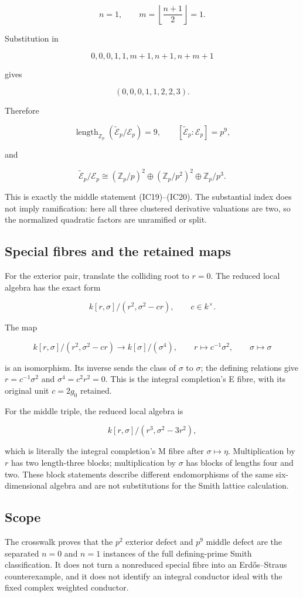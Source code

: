 \[
n=1,\qquad m=\left\lfloor\frac{n+1}{2}\right\rfloor=1.
\]

Substitution in

\[
0,0,0,1,1,m+1,n+1,n+m+1
\]

gives

\[
\boxed{(0,0,0,1,1,2,2,3).}
\]

Therefore

\[
\operatorname{length}_{\mathbb Z_p}
(\widetilde{\mathscr E}_p/\mathscr E_p)=9,\qquad
[\widetilde{\mathscr E}_p:\mathscr E_p]=p^9,
\]

and

\[
\widetilde{\mathscr E}_p/\mathscr E_p
\cong
(\mathbb Z_p/p)^2\oplus
(\mathbb Z_p/p^2)^2\oplus
\mathbb Z_p/p^3.
\]

This is exactly the middle statement (IC19)--(IC20). The substantial
index does not imply ramification: here all three clustered derivative
valuations are two, so the normalized quadratic factors are unramified
or split.

\subsection{Special fibres and the retained
maps}\label{special-fibres-and-the-retained-maps}

For the exterior pair, translate the colliding root to \(r=0\). The
reduced local algebra has the exact form

\[
k[r,\sigma]/(r^2,\sigma^2-c r),\qquad c\in k^\times.
\]

The map

\[
k[r,\sigma]/(r^2,\sigma^2-c r)
\longrightarrow k[\sigma]/(\sigma^4),\qquad
r\longmapsto c^{-1}\sigma^2,\qquad
\sigma\longmapsto\sigma
\]

is an isomorphism. Its inverse sends the class of \(\sigma\) to
\(\sigma\); the defining relations give \(r=c^{-1}\sigma^2\) and
\(\sigma^4=c^2r^2=0\). This is the integral completion's E fibre, with
its original unit \(c=2g_0\) retained.

For the middle triple, the reduced local algebra is

\[
k[r,\sigma]/(r^3,\sigma^2-3r^2),
\]

which is literally the integral completion's M fibre after
\(\sigma\mapsto\eta\). Multiplication by \(r\) has two length-three
blocks; multiplication by \(\sigma\) has blocks of lengths four and two.
These block statements describe different endomorphisms of the same
six-dimensional algebra and are not substitutions for the Smith lattice
calculation.

\subsection{Scope}\label{scope}

The crosswalk proves that the \(p^2\) exterior defect and \(p^9\) middle
defect are the separated \(n=0\) and \(n=1\) instances of the full
defining-prime Smith classification. It does not turn a nonreduced
special fibre into an Erdős--Straus counterexample, and it does not
identify an integral conductor ideal with the fixed complex weighted
conductor.
